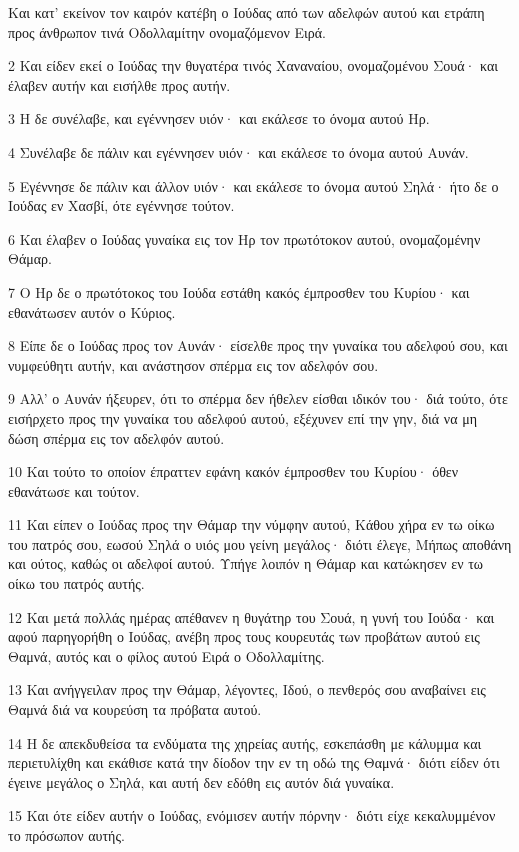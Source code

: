 \par Και κατ' εκείνον τον καιρόν κατέβη ο Ιούδας από των αδελφών αυτού και ετράπη προς άνθρωπον τινά Οδολλαμίτην ονομαζόμενον Ειρά.
\par 2 Και είδεν εκεί ο Ιούδας την θυγατέρα τινός Χαναναίου, ονομαζομένου Σουά· και έλαβεν αυτήν και εισήλθε προς αυτήν.
\par 3 Η δε συνέλαβε, και εγέννησεν υιόν· και εκάλεσε το όνομα αυτού Ηρ.
\par 4 Συνέλαβε δε πάλιν και εγέννησεν υιόν· και εκάλεσε το όνομα αυτού Αυνάν.
\par 5 Εγέννησε δε πάλιν και άλλον υιόν· και εκάλεσε το όνομα αυτού Σηλά· ήτο δε ο Ιούδας εν Χασβί, ότε εγέννησε τούτον.
\par 6 Και έλαβεν ο Ιούδας γυναίκα εις τον Ηρ τον πρωτότοκον αυτού, ονομαζομένην Θάμαρ.
\par 7 Ο Ηρ δε ο πρωτότοκος του Ιούδα εστάθη κακός έμπροσθεν του Κυρίου· και εθανάτωσεν αυτόν ο Κύριος.
\par 8 Είπε δε ο Ιούδας προς τον Αυνάν· είσελθε προς την γυναίκα του αδελφού σου, και νυμφεύθητι αυτήν, και ανάστησον σπέρμα εις τον αδελφόν σου.
\par 9 Αλλ' ο Αυνάν ήξευρεν, ότι το σπέρμα δεν ήθελεν είσθαι ιδικόν του· διά τούτο, ότε εισήρχετο προς την γυναίκα του αδελφού αυτού, εξέχυνεν επί την γην, διά να μη δώση σπέρμα εις τον αδελφόν αυτού.
\par 10 Και τούτο το οποίον έπραττεν εφάνη κακόν έμπροσθεν του Κυρίου· όθεν εθανάτωσε και τούτον.
\par 11 Και είπεν ο Ιούδας προς την Θάμαρ την νύμφην αυτού, Κάθου χήρα εν τω οίκω του πατρός σου, εωσού Σηλά ο υιός μου γείνη μεγάλος· διότι έλεγε, Μήπως αποθάνη και ούτος, καθώς οι αδελφοί αυτού. Υπήγε λοιπόν η Θάμαρ και κατώκησεν εν τω οίκω του πατρός αυτής.
\par 12 Και μετά πολλάς ημέρας απέθανεν η θυγάτηρ του Σουά, η γυνή του Ιούδα· και αφού παρηγορήθη ο Ιούδας, ανέβη προς τους κουρευτάς των προβάτων αυτού εις Θαμνά, αυτός και ο φίλος αυτού Ειρά ο Οδολλαμίτης.
\par 13 Και ανήγγειλαν προς την Θάμαρ, λέγοντες, Ιδού, ο πενθερός σου αναβαίνει εις Θαμνά διά να κουρεύση τα πρόβατα αυτού.
\par 14 Η δε απεκδυθείσα τα ενδύματα της χηρείας αυτής, εσκεπάσθη με κάλυμμα και περιετυλίχθη και εκάθισε κατά την δίοδον την εν τη οδώ της Θαμνά· διότι είδεν ότι έγεινε μεγάλος ο Σηλά, και αυτή δεν εδόθη εις αυτόν διά γυναίκα.
\par 15 Και ότε είδεν αυτήν ο Ιούδας, ενόμισεν αυτήν πόρνην· διότι είχε κεκαλυμμένον το πρόσωπον αυτής.
